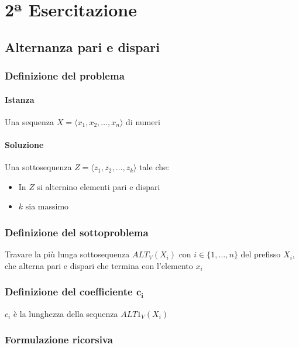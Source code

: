 
\chapter{2ª Esercitazione}

\section{Alternanza pari e dispari}
\subsection{Definizione del problema}

\subsubsection{Istanza}
Una sequenza $X = \langle x_1,x_2, \dots, x_n \rangle$ di numeri

\subsubsection{Soluzione}
Una sottosequenza $Z = \langle z_1, z_2, \dots, z_k \rangle$ tale che:
\begin{itemize}
    \item In $Z$ si alternino elementi pari e dispari
    \item $k$ sia massimo
\end{itemize}

\subsection{Definizione del sottoproblema}
Travare la più lunga sottosequenza $ALT_{V}(X_i)$ con $i \in \{1,\dots,n\}$ del prefisso $X_i$, che alterna pari e dispari che termina con l'elemento $x_i$

\subsection{Definizione del coefficiente $\mathbf{c_i}$}
$c_i$ è la lunghezza della sequenza $ALT1_V(X_i)$

\subsection{Formulazione ricorsiva}

